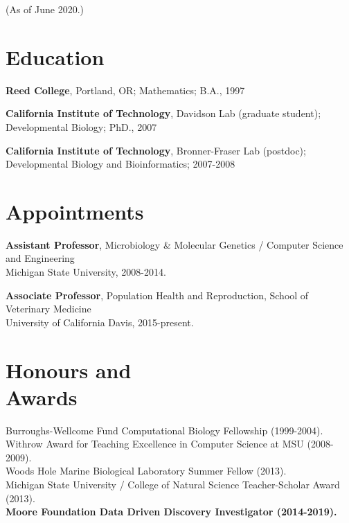 \documentclass[margin,line]{resume}
\begin{document}
\pagestyle{plain}


\begin{resume}



    {\small (As of June 2020.)}

    \section{\mysidestyle Education}

    {\bf Reed College}, Portland, OR; Mathematics; B.A., 1997

    \vspace{2mm}

    {\bf California Institute of Technology}, Davidson Lab (graduate student);
\\
Developmental Biology; PhD., 2007

    \vspace{2mm}

    {\bf California Institute of Technology}, Bronner-Fraser Lab (postdoc);\\
 Developmental Biology and Bioinformatics; 2007-2008

    \vspace{2mm}

    \section{\mysidestyle Appointments}

    {\bf Assistant Professor}, 
Microbiology \& Molecular Genetics / Computer Science and Engineering\\
Michigan State University, 2008-2014.

    {\bf Associate Professor}, 
Population Health and Reproduction, School of Veterinary Medicine \\
University of California Davis, 2015-present.

    \section{\mysidestyle Honours and\\Awards} 

Burroughs-Wellcome Fund Computational Biology Fellowship (1999-2004).\\
Withrow Award for Teaching Excellence in Computer Science at MSU (2008-2009). \\
Woods Hole Marine Biological Laboratory Summer Fellow (2013).\\
Michigan State University / College of Natural Science Teacher-Scholar Award (2013).\\
{\bf Moore Foundation Data Driven Discovery Investigator (2014-2019).}



\end{resume}
\end{document}
